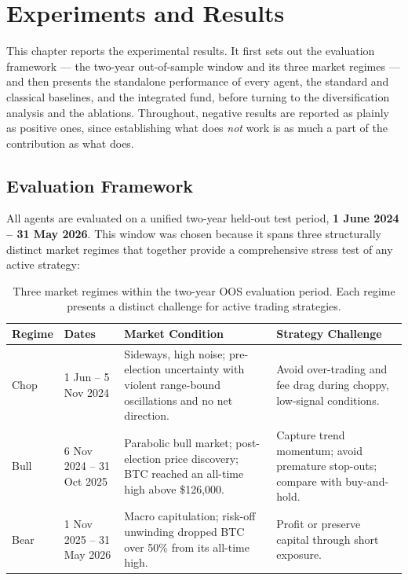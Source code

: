 \chapter{Experiments and Results}
\label{06_Experiments_and_Results}

This chapter reports the experimental results. It first sets out the evaluation framework --- the two-year out-of-sample window and its three market regimes --- and then presents the standalone performance of every agent, the standard and classical baselines, and the integrated fund, before turning to the diversification analysis and the ablations. Throughout, negative results are reported as plainly as positive ones, since establishing what does \textit{not} work is as much a part of the contribution as what does.


\section{Evaluation Framework}
\label{sec:eval_framework}

All agents are evaluated on a unified two-year held-out test period, \textbf{1 June 2024 -- 31 May 2026}. This window was chosen because it spans three structurally distinct market regimes that together provide a comprehensive stress test of any active strategy:

\begin{table}[h!]
    \centering
    \footnotesize
    \caption{Three market regimes within the two-year OOS evaluation period. Each regime presents a distinct challenge for active trading strategies.}
    \label{tab:regimes}
    \begin{tabular}{@{}P{1.5cm}P{2.2cm}P{4.3cm}P{4.3cm}@{}}
        \toprule
        \textbf{Regime} & \textbf{Dates} & \textbf{Market Condition} & \textbf{Strategy Challenge} \\
        \midrule
        Chop  & 1 Jun -- 5 Nov 2024  & Sideways, high noise; pre-election uncertainty with violent range-bound oscillations and no net direction. & Avoid over-trading and fee drag during choppy, low-signal conditions. \\[3pt]
        Bull  & 6 Nov 2024 -- 31 Oct 2025  & Parabolic bull market; post-election price discovery; BTC reached an all-time high above \$126{,}000. & Capture trend momentum; avoid premature stop-outs; compare with buy-and-hold. \\[3pt]
        Bear  & 1 Nov 2025 -- 31 May 2026  & Macro capitulation; risk-off unwinding dropped BTC over 50\% from its all-time high. & Profit or preserve capital through short exposure. \\
        \bottomrule
    \end{tabular}
\end{table}


